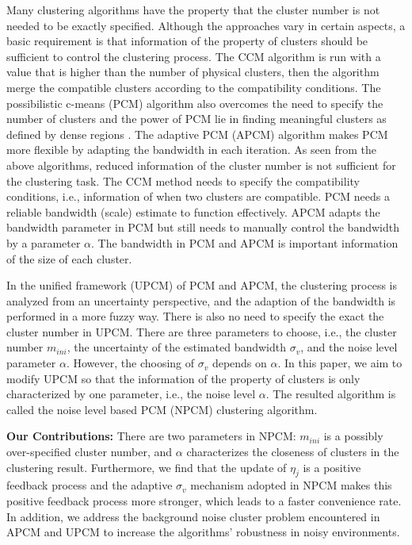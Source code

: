\documentclass[conference]{IEEEtran}
\theoremstyle{definition}
\begin{document}
Many clustering algorithms have the property that the cluster number is not needed to be exactly specified.
Although the approaches vary in certain aspects, a basic requirement is that information of the property of clusters should be sufficient to control the clustering process.
The CCM algorithm \cite{krishnapuram_fitting_1992} is run with a value that is higher than the number of physical clusters, then the algorithm merge the compatible clusters according to the compatibility conditions. The possibilistic c-means (PCM) \cite{krishnapuram_possibilistic_1993} algorithm also overcomes the need to specify the number of clusters and the power of PCM lie in finding meaningful clusters as defined by dense regions \cite{krishnapuram_possibilistic_1996}. The adaptive PCM (APCM) \cite{xenaki_novel_2016} algorithm makes PCM more flexible by adapting the bandwidth in each iteration. As seen from the above algorithms, reduced information of the cluster number is not sufficient for the clustering task. The CCM method needs to specify the compatibility conditions, i.e., information of when two clusters are compatible. PCM needs a reliable bandwidth (scale) estimate to function effectively. APCM adapts the bandwidth parameter in PCM but still needs to manually control the bandwidth by a parameter $\alpha$. The bandwidth in PCM and APCM is important information of the size of each cluster.

In the unified framework (UPCM) \cite{hou_pcm_2016} of PCM and APCM, the clustering process is analyzed from an uncertainty perspective, and the adaption of the bandwidth is performed in a more fuzzy way. There is also no need to specify the exact the cluster number in UPCM. There are three parameters to choose, i.e., the cluster number $m_{ini}$, the uncertainty of the estimated bandwidth $\sigma_v$, and the noise level parameter $\alpha$. However, the choosing of $\sigma_v$ depends on $\alpha$. In this paper, we aim to modify UPCM so that the information of the property of clusters is only characterized by one parameter, i.e., the noise level $\alpha$. 
The resulted algorithm is called the noise level based PCM (NPCM) clustering algorithm.

\textbf{Our Contributions:}
There are two parameters in NPCM: $m_{ini}$ is a possibly over-specified cluster number, and $\alpha$ characterizes the closeness of clusters in the clustering result.
Furthermore, we find that the update of $\eta_j$ is a positive feedback process and the adaptive $\sigma_v$ mechanism adopted in NPCM makes this positive feedback process more stronger, which leads to a faster convenience rate.
In addition, we address the background noise cluster problem encountered in APCM and UPCM to increase the algorithms' robustness in noisy environments.
\end{document}
